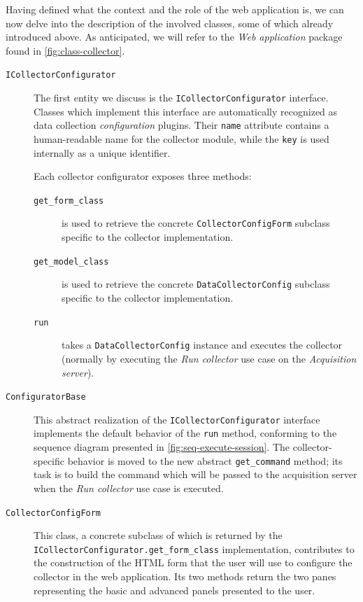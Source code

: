 Having defined what the context and the role of the web application is, we can now delve into the description of the involved classes, some of which already introduced above. As anticipated, we will refer to the \emph{Web application} package found in \vref{fig:class-collector}.

\begin{description}
  \item[\texttt{ICollectorConfigurator}] The first entity we discuss is the \texttt{ICollectorConfigurator} interface. Classes which implement this interface are automatically recognized as data collection \emph{configuration} plugins. Their \texttt{name} attribute contains a human-readable name for the collector module, while the \texttt{key} is used internally as a unique identifier.

    Each collector configurator exposes three methods:
    \begin{description}
      \item[\texttt{get\_form\_class}] is used to retrieve the concrete \texttt{CollectorConfigForm} subclass specific to the collector implementation.
      \item[\texttt{get\_model\_class}] is used to retrieve the concrete \texttt{DataCollectorConfig} subclass specific to the collector implementation.
      \item[\texttt{run}] takes a \texttt{DataCollectorConfig} instance and executes the collector (normally by executing the \emph{Run collector} use case on the \emph{Acquisition server}).
    \end{description}
  
  \item[\texttt{ConfiguratorBase}] This abstract realization of the \texttt{ICollectorConfigurator} interface implements the default behavior of the \texttt{run} method, conforming to the sequence diagram presented in \vref{fig:seq-execute-session}. The collector-specific behavior is moved to the new abstract \texttt{get\_command} method; its task is to build the command which will be passed to the acquisition server when the \emph{Run collector} use case is executed.

  \item[\texttt{CollectorConfigForm}] This class, a concrete subclass of which is returned by the \texttt{ICollector\BreakableSlash{}Configurator.get\_form\_class} implementation, contributes to the construction of the HTML form that the user will use to configure the collector in the web application. Its two methods return the two panes representing the basic and advanced panels presented to the user.


\end{description}
